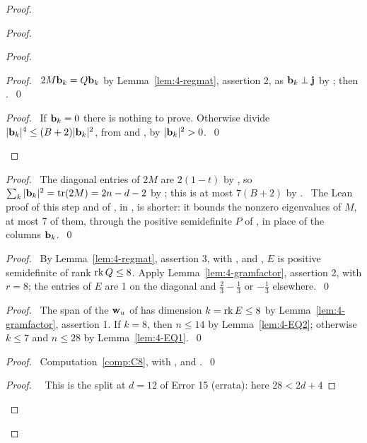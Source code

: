 \begin{proof}
\begin{proof}
\begin{proof}
   \begin{proof}\pf\ $2M{\mathbf b}_k=Q{\mathbf b}_k$ by Lemma~\ref{lem:4-regmat}, assertion 2, as ${\mathbf b}_k\perp{\mathbf j}$ by
    ; then .~\qed\end{proof}
   \qedstep
   \begin{proof}\pf\ If ${\mathbf b}_k=0$ there is nothing to prove. Otherwise divide
    $|{\mathbf b}_k|^4\le(B+2)|{\mathbf b}_k|^2$, from  and , by
    $|{\mathbf b}_k|^2>0$.~\qed\end{proof}
  \end{proof}
  \begin{proof}\pf\ The diagonal entries of $2M$ are $2(1-t)$ by , so
   $\sum_k|{\mathbf b}_k|^2=\mathop{\mathrm{tr}}\nolimits(2M)=2n-d-2$ by ; this is at most $7(B+2)$ by
   . \new\ The Lean proof of this step and of
   , in , is shorter: it
   bounds the nonzero eigenvalues of $M$, at most 7 of them, through the positive semidefinite
   $P$ of , in place of the columns ${\mathbf b}_k$.~\qed\end{proof}
  \begin{proof}\pf\ By Lemma~\ref{lem:4-regmat}, assertion 3, with ,
    and , $E$ is positive semidefinite of rank $\mathop{\mathrm{rk}}\nolimits Q\le8$. Apply
   Lemma~\ref{lem:4-gramfactor}, assertion 2, with $r=8$; the entries of $E$ are 1 on the
   diagonal and $\frac23-\frac13$ or $-\frac13$ elsewhere.~\qed\end{proof}
  \begin{proof}\pf\ The span of the ${\mathbf w}_u$ of  has dimension $k=\mathop{\mathrm{rk}}\nolimits E\le8$
   by Lemma~\ref{lem:4-gramfactor}, assertion 1. If $k=8$, then $n\le14$ by Lemma~\ref{lem:4-EQ2}; otherwise $k\le7$ and $n\le28$ by
   Lemma~\ref{lem:4-EQ1}.~\qed\end{proof}
  \begin{proof}\pf\ Computation~\ref{comp:C8}, with ,  and
   .~\qed\end{proof}
  \begin{proof}\pf\ \repair\ This is the split at $d=12$ of Error 15 (errata): here $28<2d+4$

\end{proof}
\end{proof}
\end{proof}
